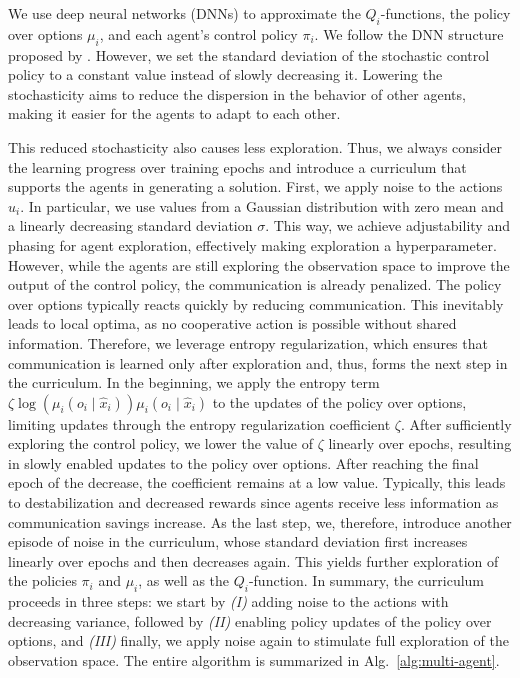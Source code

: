 \documentclass[12pt, final]{l4dc2023}
\begin{document}
We use deep neural networks (DNNs) to approximate the $Q_i$-functions, the policy over options $\mu_i$, and each agent's control policy $\pi_i$. 
We follow the DNN structure proposed by \cite{funk2021learning}.
However, we set the standard deviation of the stochastic control policy to a constant value instead of slowly decreasing it. Lowering the stochasticity aims to reduce the dispersion in the behavior of other agents, making it easier for the agents to adapt to each other. 

This reduced stochasticity also causes less exploration. Thus, we always consider the learning progress over training epochs and introduce a curriculum that supports the agents in generating a solution. First, we apply noise to the actions $u_i$. In particular, we use values from a Gaussian distribution with zero mean and a linearly decreasing standard deviation $\sigma$. This way, we achieve adjustability and phasing for agent exploration, effectively making exploration a hyperparameter. However, while the agents are still exploring the observation space to improve the output of the control policy, the communication is already penalized. 
The policy over options typically reacts quickly by reducing communication. This inevitably leads to local optima, as no cooperative action is possible without shared information. Therefore, we leverage entropy regularization, which ensures that communication is learned only after exploration and, thus, forms the next step in the curriculum. In the beginning, we apply the entropy term $\zeta \log(\mu_i (o_i \mid \hat{x}_i))\mu_i (o_i \mid \hat{x}_i)$ to the updates of the policy over options, limiting updates through the entropy regularization coefficient $\zeta$. After sufficiently exploring the control policy, we lower the value of $\zeta$ linearly over epochs, resulting in slowly enabled updates to the policy over options. After reaching the final epoch of the decrease, the coefficient remains at a low value. Typically, this leads to destabilization and decreased rewards since agents receive less information as communication savings increase. As the last step, we, therefore, introduce another episode of noise in the curriculum, whose standard deviation first increases linearly over epochs and then decreases again. This yields further exploration of the policies $\pi_i$ and $\mu_i$, as well as the $Q_i$-function. In summary, the curriculum proceeds in three steps: we start by \emph{(I)} adding noise to the actions with decreasing variance, followed by \emph{(II)} enabling policy updates of the policy over options, and \emph{(III)} finally, we apply noise again to stimulate full exploration of the observation space.
The entire algorithm is summarized in Alg.~\ref{alg:multi-agent}.
\end{document}
